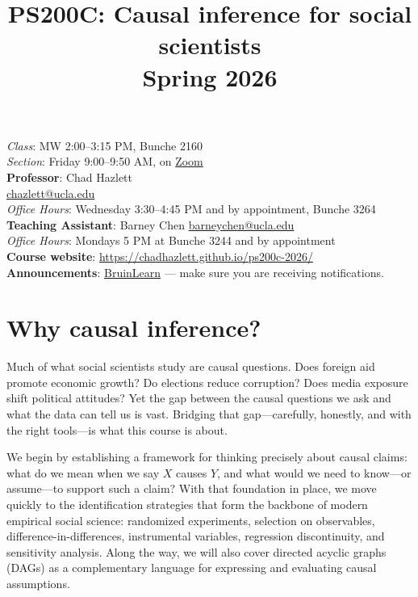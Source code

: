 \documentclass[PS]{syllabus}
\begin{document}
\title{PS200C: Causal inference for social scientists \\ Spring 2026}

\begin{syllabus}
\begin{center}
\vspace{-.75in}

\textit{Class}:  MW 2:00--3:15 PM, Bunche 2160 \\
\textit{Section}: Friday 9:00--9:50 AM, on \href{https://ucla.zoom.us/j/94794109684}{Zoom}\\
\bigskip
\textbf{Professor}: Chad Hazlett\\
\href{mailto: chazlett@ucla.edu}{ chazlett@ucla.edu}  \\
\textit{Office Hours}:  Wednesday 3:30--4:45 PM and by appointment, Bunche 3264  \\
\bigskip
\textbf{Teaching Assistant}: Barney Chen  \href{mailto: barneychen@ucla.edu}{barneychen@ucla.edu} \\
\textit{Office Hours}: Mondays 5 PM at Bunche 3244 and by appointment \\
\bigskip
\textbf{Course website}: \url{https://chadhazlett.github.io/ps200c-2026/} \\
\textbf{Announcements}: \href{https://bruinlearn.ucla.edu}{BruinLearn} --- make sure you are receiving notifications.
 \\
\end{center}


\section*{Why causal inference?}

Much of what social scientists study are causal questions. Does foreign aid promote economic growth? Do elections reduce corruption? Does media exposure shift political attitudes? Yet the gap between the causal questions we ask and what the data can tell us is vast. Bridging that gap---carefully, honestly, and with the right tools---is what this course is about.

We begin by establishing a framework for thinking precisely about causal claims: what do we mean when we say $X$ causes $Y$, and what would we need to know---or assume---to support such a claim? With that foundation in place, we move quickly to the identification strategies that form the backbone of modern empirical social science: randomized experiments, selection on observables, difference-in-differences, instrumental variables, regression discontinuity, and sensitivity analysis. Along the way, we will also cover directed acyclic graphs (DAGs) as a complementary language for expressing and evaluating causal assumptions.


\end{syllabus}
\end{document}
